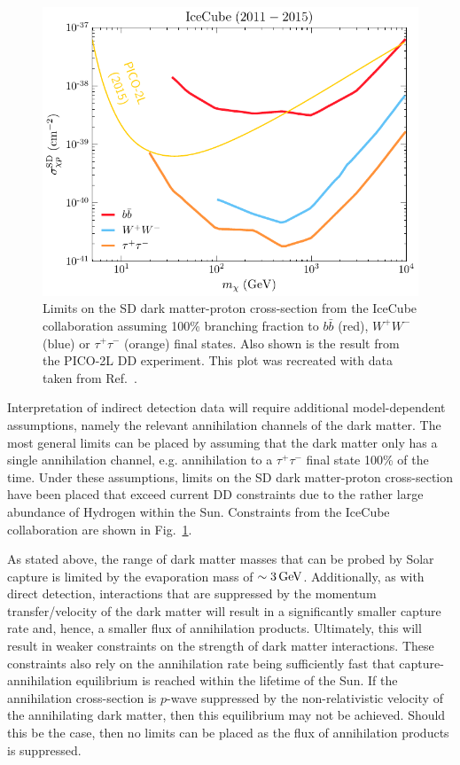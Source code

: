 \begin{figure}[!t]
    \centering
    \includegraphics{IceCube_2016.pdf}
    \caption[Limits on the SD dark matter-proton cross-section from the IceCube collaboration assuming 100\% branching fraction to $b\bar{b}$ (red), $W^+ W^-$ (blue) or $\tau^+ \tau^-$ (orange) final states]{Limits on the SD dark matter-proton cross-section from the IceCube collaboration assuming 100\% branching fraction to $b\bar{b}$ (red), $W^+ W^-$ (blue) or $\tau^+ \tau^-$ (orange) final states. Also shown is the result from the PICO-2L DD experiment. This plot was recreated with data taken from Ref.~\cite{IceCube:2016dgk_mar_Searchannihilatingdark}.}
    \label{ch1:fig:IceCube_2016_SD}
\end{figure}

Interpretation of indirect detection data will require additional model-dependent assumptions, namely the relevant annihilation channels of the dark matter. The most general limits can be placed by assuming that the dark matter only has a single annihilation channel, e.g. annihilation to a $\tau^+\tau^-$ final state 100\% of the time. Under these assumptions, limits on the SD dark matter-proton cross-section have been placed that exceed current DD constraints due to the rather large abundance of Hydrogen within the Sun. Constraints from the IceCube collaboration are shown in Fig.~\ref{ch1:fig:IceCube_2016_SD}.

As stated above, the range of dark matter masses that can be probed by Solar capture is limited by the evaporation mass of $\sim 3{\rm \,GeV}$. Additionally, as with direct detection, interactions that are suppressed by the momentum transfer/velocity of the dark matter will result in a significantly smaller capture rate and, hence, a smaller flux of annihilation products. Ultimately, this will result in weaker constraints on the strength of dark matter interactions. These constraints also rely on the annihilation rate being sufficiently fast that capture-annihilation equilibrium is reached within the lifetime of the Sun. If the annihilation cross-section is $p$-wave suppressed by the non-relativistic velocity of the annihilating dark matter, then this equilibrium may not be achieved. Should this be the case, then no limits can be placed as the flux of annihilation products is suppressed. 

